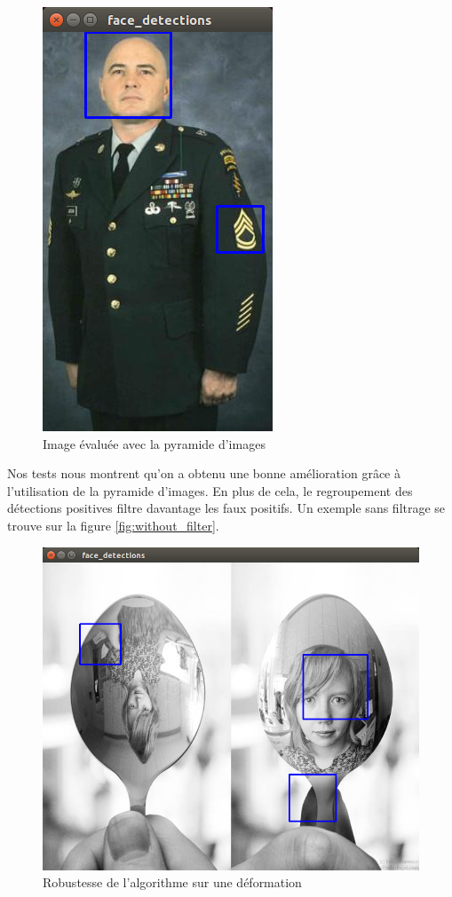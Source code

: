 \documentclass[a4paper,11pt]{article}
\begin{document}
	\begin{figure}[H]
	    \centering
	    \includegraphics[scale=0.3]{scale_3.png}
	    \caption{Image évaluée avec la pyramide d'images}
	    \label{fig:scale_3}
	\end{figure}

    Nos tests nous montrent qu'on a obtenu une bonne amélioration grâce à l'utilisation de la pyramide d'images.
    En plus de cela, le regroupement des détections positives filtre davantage les faux positifs.
    Un exemple sans filtrage se trouve sur la figure \ref{fig:without_filter}.

	\begin{figure}[H]
	    \centering
	    \includegraphics[scale=0.3]{last_scale.png}
	    \caption{Robustesse de l'algorithme sur une déformation}
	    \label{fig:last_scale}
	\end{figure}
\end{document}
